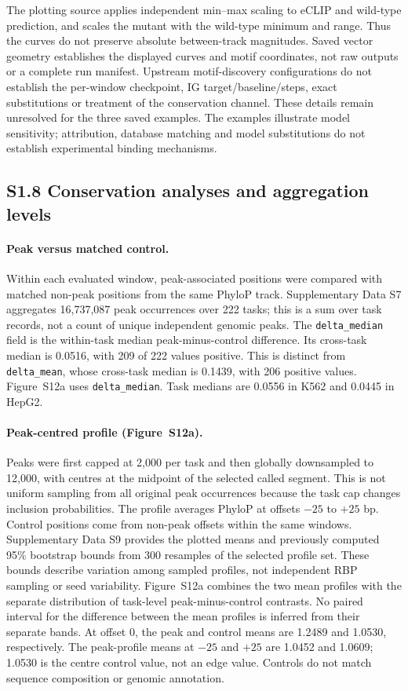 \documentclass[11pt]{article}
\begin{document}
The plotting source applies independent min--max scaling to eCLIP and wild-type prediction, and scales the mutant with the wild-type minimum and range. Thus the curves do not preserve absolute between-track magnitudes. Saved vector geometry establishes the displayed curves and motif coordinates, not raw outputs or a complete run manifest. Upstream motif-discovery configurations do not establish the per-window checkpoint, IG target/baseline/steps, exact substitutions or treatment of the conservation channel. These details remain unresolved for the three saved examples. The examples illustrate model sensitivity; attribution, database matching and model substitutions do not establish experimental binding mechanisms.

\subsection*{S1.8 Conservation analyses and aggregation levels}

\paragraph{Peak versus matched control.} Within each evaluated window, peak-associated positions were compared with matched non-peak positions from the same PhyloP track. Supplementary Data S7 aggregates 16{,}737{,}087 peak occurrences over 222 tasks; this is a sum over task records, not a count of unique independent genomic peaks. The \texttt{delta\_median} field is the within-task median peak-minus-control difference. Its cross-task median is 0.0516, with 209 of 222 values positive. This is distinct from \texttt{delta\_mean}, whose cross-task median is 0.1439, with 206 positive values. Figure~S12a uses \texttt{delta\_median}. Task medians are 0.0556 in K562 and 0.0445 in HepG2.

\paragraph{Peak-centred profile (Figure~S12a).} Peaks were first capped at 2,000 per task and then globally downsampled to 12,000, with centres at the midpoint of the selected called segment. This is not uniform sampling from all original peak occurrences because the task cap changes inclusion probabilities. The profile averages PhyloP at offsets $-25$ to $+25$ bp. Control positions come from non-peak offsets within the same windows. Supplementary Data S9 provides the plotted means and previously computed 95\% bootstrap bounds from 300 resamples of the selected profile set. These bounds describe variation among sampled profiles, not independent RBP sampling or seed variability. Figure~S12a combines the two mean profiles with the separate distribution of task-level peak-minus-control contrasts. No paired interval for the difference between the mean profiles is inferred from their separate bands. At offset 0, the peak and control means are 1.2489 and 1.0530, respectively. The peak-profile means at $-25$ and $+25$ are 1.0452 and 1.0609; 1.0530 is the centre control value, not an edge value. Controls do not match sequence composition or genomic annotation.
\end{document}
